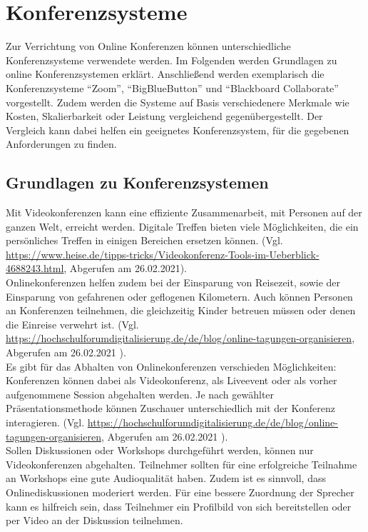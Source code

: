 \chapter{Konferenzsysteme}
Zur Verrichtung von Online Konferenzen können unterschiedliche Konferenzsysteme verwendete werden.
Im Folgenden werden Grundlagen zu online Konferenzsystemen erklärt.
Anschließend werden exemplarisch die Konferenzsysteme \enquote{Zoom}, \enquote{BigBlueButton} und \enquote{Blackboard Collaborate} vorgestellt.
Zudem werden die Systeme auf Basis verschiedenere Merkmale wie Kosten, Skalierbarkeit oder Leistung vergleichend gegenübergestellt.
Der Vergleich kann dabei helfen ein geeignetes Konferenzsystem, für die gegebenen Anforderungen zu finden.

\section{Grundlagen zu Konferenzsystemen}
Mit Videokonferenzen kann eine effiziente Zusammenarbeit, mit Personen auf der ganzen Welt, erreicht werden.
Digitale Treffen bieten viele Möglichkeiten, die ein persönliches Treffen in einigen Bereichen ersetzen können.
(Vgl. \url{https://www.heise.de/tipps-tricks/Videokonferenz-Tools-im-Ueberblick-4688243.html}, Abgerufen am 26.02.2021).
\\
Onlinekonferenzen helfen zudem bei der Einsparung von Reisezeit, sowie der Einsparung von gefahrenen oder geflogenen Kilometern.
Auch können Personen an Konferenzen teilnehmen, die gleichzeitig Kinder betreuen müssen oder denen die Einreise verwehrt ist.
(Vgl. \url{https://hochschulforumdigitalisierung.de/de/blog/online-tagungen-organisieren}, Abgerufen am 26.02.2021 ).
\\
Es gibt für das Abhalten von Onlinekonferenzen verschieden Möglichkeiten:\\
Konferenzen können dabei als Videokonferenz, als Liveevent oder als vorher aufgenommene Session abgehalten werden.
Je nach gewählter Präsentationsmethode können Zuschauer unterschiedlich mit der Konferenz interagieren.
(Vgl. \url{https://hochschulforumdigitalisierung.de/de/blog/online-tagungen-organisieren}, Abgerufen am 26.02.2021 ).
\\
Sollen Diskussionen oder Workshops durchgeführt werden, können nur Videokonferenzen abgehalten.
Teilnehmer sollten für eine erfolgreiche Teilnahme an Workshops eine gute Audioqualität haben.
Zudem ist es sinnvoll, dass Onlinediskussionen moderiert werden.
Für eine bessere Zuordnung der Sprecher kann es hilfreich sein, dass Teilnehmer ein Profilbild von sich bereitstellen oder per Video an der Diskussion teilnehmen.
